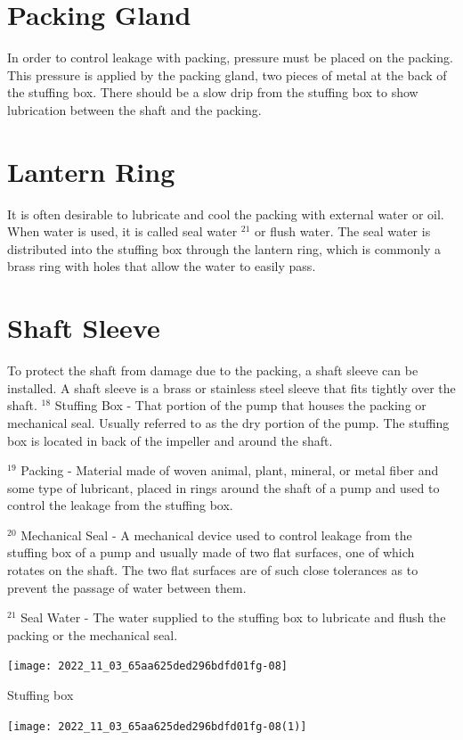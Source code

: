 \documentclass[10pt]{article}
\begin{document}
\section{Packing Gland}
In order to control leakage with packing, pressure must be placed on the packing. This pressure is applied by the packing gland, two pieces of metal at the back of the stuffing box. There should be a slow drip from the stuffing box to show lubrication between the shaft and the packing.

\section{Lantern Ring}
It is often desirable to lubricate and cool the packing with external water or oil. When water is used, it is called seal water ${ }^{21}$ or flush water. The seal water is distributed into the stuffing box through the lantern ring, which is commonly a brass ring with holes that allow the water to easily pass.

\section{Shaft Sleeve}
To protect the shaft from damage due to the packing, a shaft sleeve can be installed. A shaft sleeve is a brass or stainless steel sleeve that fits tightly over the shaft. ${ }^{18}$ Stuffing Box - That portion of the pump that houses the packing or mechanical seal. Usually referred to as the dry portion of the pump. The stuffing box is located in back of the impeller and around the shaft.

${ }^{19}$ Packing - Material made of woven animal, plant, mineral, or metal fiber and some type of lubricant, placed in rings around the shaft of a pump and used to control the leakage from the stuffing box.

${ }^{20}$ Mechanical Seal - A mechanical device used to control leakage from the stuffing box of a pump and usually made of two flat surfaces, one of which rotates on the shaft. The two flat surfaces are of such close tolerances as to prevent the passage of water between them.

${ }^{21}$ Seal Water - The water supplied to the stuffing box to lubricate and flush the packing or the mechanical seal.

\texttt{[image: 2022\_11\_03\_65aa625ded296bdfd01fg-08]}

Stuffing box

\texttt{[image: 2022\_11\_03\_65aa625ded296bdfd01fg-08(1)]}
\end{document}
